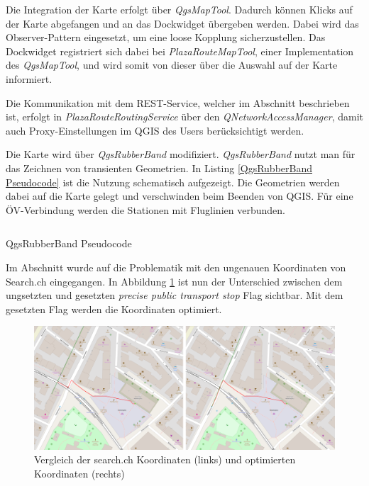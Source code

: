 Die Integration der Karte erfolgt über \emph{QgsMapTool}. Dadurch können Klicks auf der Karte abgefangen und an das Dockwidget übergeben werden. Dabei wird das Observer-Pattern \cite{gof_patterns} eingesetzt, um eine loose Kopplung sicherzustellen. Das Dockwidget registriert sich dabei bei \emph{PlazaRouteMapTool}, einer Implementation des \emph{QgsMapTool}, und wird somit von dieser über die Auswahl auf der Karte informiert.

Die Kommunikation mit dem \ac{REST}-Service, welcher im Abschnitt  beschrieben ist, erfolgt in \emph{PlazaRouteRoutingService} über den \emph{QNetworkAccessManager}, damit auch Proxy-Einstellungen im QGIS des Users berücksichtigt werden.

Die Karte wird über \emph{QgsRubberBand} modifiziert. \emph{QgsRubberBand} nutzt man für das Zeichnen von transienten Geometrien. In Listing \ref{QgsRubberBand Pseudocode} ist die Nutzung schematisch aufgezeigt. Die Geometrien werden dabei auf die Karte gelegt und verschwinden beim Beenden von QGIS. Für eine ÖV-Verbindung werden die Stationen mit Fluglinien verbunden.

\begin{listing}[ht]
    \inputminted{python}{projectdoc/listing/rubber_band.py}
    \caption{QgsRubberBand Pseudocode}
    \label{QgsRubberBand Pseudocode}
\end{listing}

Im Abschnitt  wurde auf die Problematik mit den ungenauen Koordinaten von Search.ch \cite{search_ch_route_api} eingegangen. In Abbildung \ref{fig:precise_public_transport_stops_comparison} ist nun der Unterschied zwischen dem ungsetzten und gesetzten \emph{precise public transport stop} Flag sichtbar. Mit dem gesetzten Flag werden die Koordinaten optimiert.

\begin{figure}[ht]
\centering
\includegraphics[width=1.0\linewidth]{projectdoc/img/precise_public_transport_stops_comparison}
\caption[Vergleich search.ch Koordinaten und optimierte Koordinaten]{Vergleich der search.ch Koordinaten (links) und optimierten Koordinaten (rechts)}
\label{fig:precise_public_transport_stops_comparison}
\end{figure}


